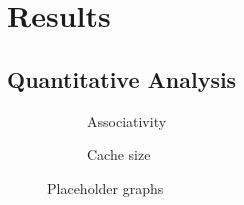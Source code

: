 \section{Results}

\subsection{Quantitative Analysis}

\begin{figure}[ht]
    \centering
    \begin{subfigure}[b]{0.45\textwidth}
        \centering
        \caption{Associativity}
        \label{fig:associativity}
    \end{subfigure}
    \hfill
    \begin{subfigure}[b]{0.45\textwidth}
        \centering
        \caption{Cache size}
        \label{fig:cache_size}
    \end{subfigure}
    \hfill
    \caption{Placeholder graphs}
    \label{fig:placeholder}
\end{figure}


